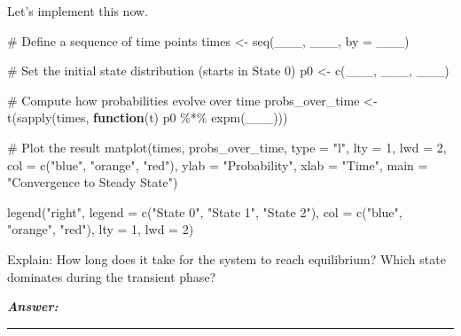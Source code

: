 \documentclass[
]{article}
\newenvironment{Shaded}{\begin{snugshade}}{\end{snugshade}}
\newcommand{\AttributeTok}[1]{\textcolor[rgb]{0.40,0.45,0.13}{#1}}
\newcommand{\CommentTok}[1]{\textcolor[rgb]{0.37,0.37,0.37}{#1}}
\newcommand{\ControlFlowTok}[1]{\textcolor[rgb]{0.00,0.23,0.31}{\textbf{#1}}}
\newcommand{\DecValTok}[1]{\textcolor[rgb]{0.68,0.00,0.00}{#1}}
\newcommand{\FunctionTok}[1]{\textcolor[rgb]{0.28,0.35,0.67}{#1}}
\newcommand{\NormalTok}[1]{\textcolor[rgb]{0.00,0.23,0.31}{#1}}
\newcommand{\OtherTok}[1]{\textcolor[rgb]{0.00,0.23,0.31}{#1}}
\newcommand{\SpecialCharTok}[1]{\textcolor[rgb]{0.37,0.37,0.37}{#1}}
\newcommand{\StringTok}[1]{\textcolor[rgb]{0.13,0.47,0.30}{#1}}
\begin{document}
Let's implement this now.

\begin{Shaded}
\begin{Highlighting}[]
\CommentTok{\# Define a sequence of time points}
\NormalTok{times }\OtherTok{\textless{}{-}} \FunctionTok{seq}\NormalTok{(\_\_\_, \_\_\_, }\AttributeTok{by =}\NormalTok{ \_\_\_)}

\CommentTok{\# Set the initial state distribution (starts in State 0)}
\NormalTok{p0 }\OtherTok{\textless{}{-}} \FunctionTok{c}\NormalTok{(\_\_\_, \_\_\_, \_\_\_)}

\CommentTok{\# Compute how probabilities evolve over time}
\NormalTok{probs\_over\_time }\OtherTok{\textless{}{-}} \FunctionTok{t}\NormalTok{(}\FunctionTok{sapply}\NormalTok{(times, }\ControlFlowTok{function}\NormalTok{(t) p0 }\SpecialCharTok{\%*\%} \FunctionTok{expm}\NormalTok{(\_\_\_)))}

\CommentTok{\# Plot the result}
\FunctionTok{matplot}\NormalTok{(times, probs\_over\_time, }\AttributeTok{type =} \StringTok{"l"}\NormalTok{, }\AttributeTok{lty =} \DecValTok{1}\NormalTok{, }\AttributeTok{lwd =} \DecValTok{2}\NormalTok{,}
        \AttributeTok{col =} \FunctionTok{c}\NormalTok{(}\StringTok{"blue"}\NormalTok{, }\StringTok{"orange"}\NormalTok{, }\StringTok{"red"}\NormalTok{),}
        \AttributeTok{ylab =} \StringTok{"Probability"}\NormalTok{, }\AttributeTok{xlab =} \StringTok{"Time"}\NormalTok{,}
        \AttributeTok{main =} \StringTok{"Convergence to Steady State"}\NormalTok{)}

\FunctionTok{legend}\NormalTok{(}\StringTok{"right"}\NormalTok{, }\AttributeTok{legend =} \FunctionTok{c}\NormalTok{(}\StringTok{"State 0"}\NormalTok{, }\StringTok{"State 1"}\NormalTok{, }\StringTok{"State 2"}\NormalTok{),}
        \AttributeTok{col =} \FunctionTok{c}\NormalTok{(}\StringTok{"blue"}\NormalTok{, }\StringTok{"orange"}\NormalTok{, }\StringTok{"red"}\NormalTok{), }\AttributeTok{lty =} \DecValTok{1}\NormalTok{, }\AttributeTok{lwd =} \DecValTok{2}\NormalTok{)}
\end{Highlighting}
\end{Shaded}

Explain: How long does it take for the system to reach equilibrium?
Which state dominates during the transient phase?

\emph{\textbf{Answer:}}

\begin{center}\rule{0.5\linewidth}{0.5pt}\end{center}
\end{document}
